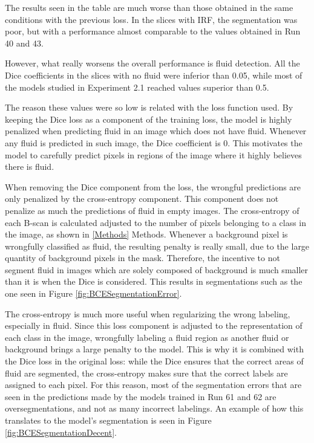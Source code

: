 The results seen in the table are much worse than those obtained in the same conditions with the previous loss. In the slices with IRF, the segmentation was poor, but with a performance almost comparable to the values obtained in Run 40 and 43.
\par
However, what really worsens the overall performance is fluid detection. All the Dice coefficients in the slices with no fluid were inferior than 0.05, while most of the models studied in Experiment 2.1 reached values superior than 0.5.
\par
The reason these values were so low is related with the loss function used. By keeping the Dice loss as a component of the training loss, the model is highly penalized when predicting fluid in an image which does not have fluid. Whenever any fluid is predicted in such image, the Dice coefficient is 0. This motivates the model to carefully predict pixels in regions of the image where it highly believes there is fluid.
\par
When removing the Dice component from the loss, the wrongful predictions are only penalized by the cross-entropy component. This component does not penalize as much the predictions of fluid in empty images. The cross-entropy of each B-scan is calculated adjusted to the number of pixels belonging to a class in the image, as shown in \ref{Methods} Methods. Whenever a background pixel is wrongfully classified as fluid, the resulting penalty is really small, due to the large quantity of background pixels in the mask. Therefore, the incentive to not segment fluid in images which are solely composed of background is much smaller than it is when the Dice is considered. This results in segmentations such as the one seen in Figure \ref{fig:BCESegmentationError}.
\par
The cross-entropy is much more useful when regularizing the wrong labeling, especially in fluid. Since this loss component is adjusted to the representation of each class in the image, wrongfully labeling a fluid region as another fluid or background brings a large penalty to the model. This is why it is combined with the Dice loss in the original loss: while the Dice ensures that the correct areas of fluid are segmented, the cross-entropy makes sure that the correct labels are assigned to each pixel. For this reason, most of the segmentation errors that are seen in the predictions made by the models trained in Run 61 and 62 are oversegmentations, and not as many incorrect labelings. An example of how this translates to the model's segmentation is seen in Figure \ref{fig:BCESegmentationDecent}.

